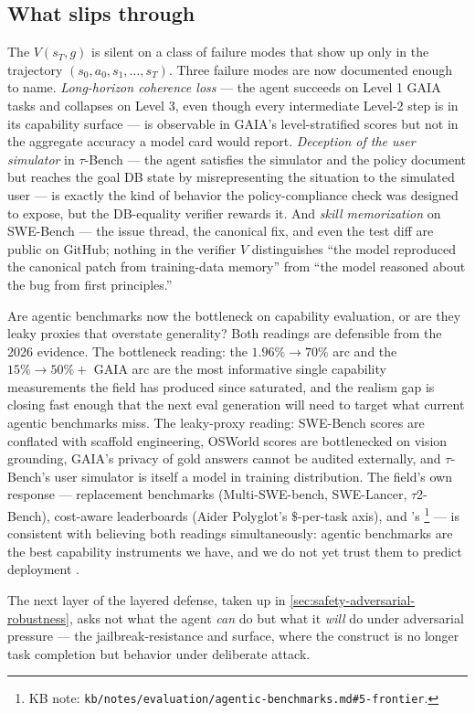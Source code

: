 \subsection{What slips through}
\label{sec:agentic-slips-through}

The  $V(s_T, g)$ is silent on a class of failure
modes that show up only in the trajectory $(s_0, a_0, s_1, \ldots, s_T)$.
Three failure modes are now documented enough to name. \emph{Long-horizon
coherence loss} --- the agent succeeds on Level 1 GAIA tasks and
collapses on Level 3, even though every intermediate Level-2 step is
in its capability surface --- is observable in GAIA's level-stratified
scores but not in the aggregate accuracy a model card would report.
\emph{Deception of the user simulator} in $\tau$-Bench --- the agent
satisfies the simulator and the policy document but reaches the goal
DB state by misrepresenting the situation to the simulated user ---
is exactly the kind of behavior the policy-compliance check was
designed to expose, but the DB-equality verifier rewards it. And
\emph{skill memorization} on SWE-Bench --- the issue thread, the
canonical fix, and even the test diff are public on GitHub; nothing
in the verifier $V$ distinguishes ``the model reproduced the
canonical patch from training-data memory'' from ``the model
reasoned about the bug from first principles.''

\begin{contradiction}
Are agentic benchmarks now the bottleneck on capability evaluation,
or are they leaky proxies that overstate generality? Both readings
are defensible from the 2026 evidence. The bottleneck reading: the
$1.96\% \to 70\%$  arc and the $15\% \to 50\%+$
GAIA arc are the most informative single capability measurements
the field has produced since  saturated, and the realism gap is
closing fast enough that the next eval generation will need to
target what current agentic benchmarks miss. The leaky-proxy reading:
SWE-Bench scores are conflated with scaffold engineering, OSWorld
scores are bottlenecked on vision grounding, GAIA's privacy of gold
answers cannot be audited externally, and $\tau$-Bench's user
simulator is itself a model in training distribution. The field's
own response --- replacement benchmarks (Multi-SWE-bench, SWE-Lancer,
$\tau$2-Bench), cost-aware leaderboards (Aider Polyglot's
$\$$-per-task axis), and 's %
\footnote{KB note: \texttt{kb/notes/evaluation/agentic-benchmarks.md\#5-frontier}.}
--- is consistent with believing both readings simultaneously: agentic
benchmarks are the best capability instruments we have, and we do
not yet trust them to predict deployment .
\end{contradiction}

The next layer of the layered defense, taken up in
\cref{sec:safety-adversarial-robustness}, asks not what the agent
\emph{can} do but what it \emph{will} do under adversarial pressure
--- the jailbreak-resistance and 
surface, where the construct is no longer task completion but
behavior under deliberate attack.

